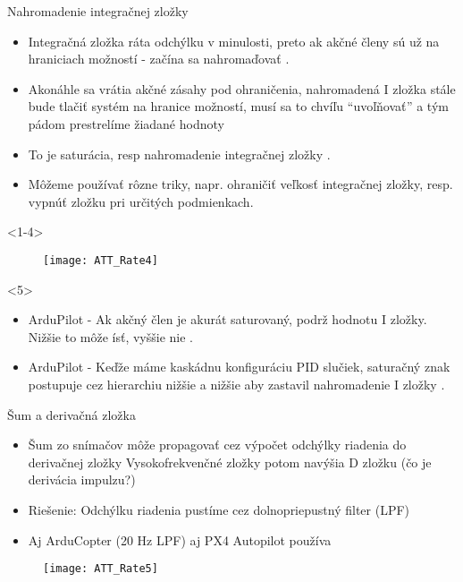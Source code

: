 \begin{frame}[t]{Nahromadenie integračnej zložky}
  \begin{itemize}
    \item<1-3> Integračná zložka ráta odchýlku v minulosti, preto ak akčné členy sú už na hraniciach možností - začína sa nahromaďovať .
    \item<2-3> Akonáhle sa vrátia akčné zásahy pod ohraničenia, nahromadená I zložka stále bude tlačiť systém na hranice možností, musí sa to chvíľu ``uvoľňovať''  a tým pádom prestrelíme  žiadané hodnoty
    \item<3> To je saturácia, resp nahromadenie integračnej zložky .
    \item<4-> Môžeme používať rôzne triky, napr. ohraničiť veľkosť integračnej zložky, resp. vypnúť zložku pri určitých podmienkach.
  \end{itemize}
      \begin{onlyenv}<1-4>
  \begin{figure}
\centering
  \texttt{[image: ATT\_Rate4]}\\
\end{figure}
\end{onlyenv}

      \begin{onlyenv}<5>
        \begin{itemize}
  \item<1-> ArduPilot - Ak akčný člen je akurát saturovaný, podrž hodnotu I zložky. Nižšie to môže ísť, vyššie nie \citep{AP:PID}.
  \item<2-> ArduPilot - Keďže máme kaskádnu konfiguráciu PID slučiek, saturačný znak postupuje cez hierarchiu nižšie a nižšie aby zastavil nahromadenie I zložky \citep{AP:PID}.
            \end{itemize}
      \end{onlyenv}

\end{frame}



\begin{frame}[t]{Šum a derivačná zložka}
  \begin{itemize}
    \item<1-> Šum zo snímačov môže propagovať cez výpočet odchýlky riadenia do derivačnej zložky Vysokofrekvenčné zložky potom navýšia D zložku (čo je derivácia impulzu?)
    \item<2-> Riešenie: Odchýlku riadenia pustíme cez dolnopriepustný  filter (LPF)
    \item<3->  Aj ArduCopter (20 Hz LPF) aj PX4 Autopilot používa \citep{AP:PID,PX4:PID}
  \end{itemize}

  \begin{figure}
\centering
  \texttt{[image: ATT\_Rate5]}\\
\end{figure}

\end{frame}




